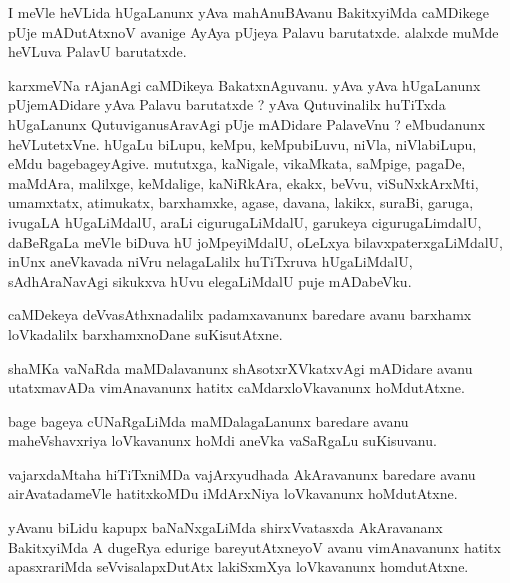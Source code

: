 \documentclass{article}
\begin{document}
\begin{mng}%
I meVle heVLida hUgaLanunx yAva mahAnuBAvanu BakitxyiMda caMDikege pUje mADutAtxnoV avanige AyAya 
pUjeya Palavu barutatxde. alalxde muMde heVLuva PalavU barutatxde.
\end{mng}

\begin{mng}%
karxmeVNa rAjanAgi caMDikeya BakatxnAguvanu. yAva yAva hUgaLanunx pUjemADidare yAva Palavu 
barutatxde ? yAva Qutuvinalilx huTiTxda hUgaLanunx QutuviganusAravAgi pUje mADidare PalaveVnu ? 
eMbudanunx heVLutetxVne. hUgaLu biLupu, keMpu, keMpubiLuvu, niVla, niVlabiLupu, eMdu 
bagebageyAgive. mututxga, kaNigale, vikaMkata, saMpige, pagaDe, maMdAra, malilxge, keMdalige, 
kaNiRkAra, ekakx, beVvu, viSuNxkArxMti, umamxtatx, atimukatx, barxhamxke, agase, davana, lakikx, 
suraBi, garuga, ivugaLA hUgaLiMdalU, araLi cigurugaLiMdalU, garukeya cigurugaLimdalU, daBeRgaLa 
meVle biDuva hU joMpeyiMdalU, oLeLxya bilavxpaterxgaLiMdalU, inUnx aneVkavada niVru nelagaLalilx 
huTiTxruva hUgaLiMdalU, sAdhAraNavAgi sikukxva hUvu elegaLiMdalU puje mADabeVku.
\end{mng}

\begin{mng}%
caMDekeya deVvasAthxnadalilx padamxavanunx baredare avanu barxhamx loVkadalilx barxhamxnoDane 
suKisutAtxne.
\end{mng}

\begin{mng}%
shaMKa vaNaRda maMDalavanunx shAsotxrXVkatxvAgi mADidare avanu utatxmavADa vimAnavanunx hatitx 
caMdarxloVkavanunx hoMdutAtxne.
\end{mng}

\begin{mng}%
bage bageya cUNaRgaLiMda maMDalagaLanunx baredare avanu maheVshavxriya loVkavanunx hoMdi aneVka 
vaSaRgaLu suKisuvanu.
\end{mng}

\begin{mng}%
vajarxdaMtaha hiTiTxniMDa vajArxyudhada AkAravanunx baredare avanu airAvatadameVle hatitxkoMDu 
iMdArxNiya loVkavanunx hoMdutAtxne.
\end{mng}

\begin{mng}%
yAvanu biLidu kapupx baNaNxgaLiMda shirxVvatasxda AkAravananx BakitxyiMda A dugeRya edurige 
bareyutAtxneyoV avanu vimAnavanunx hatitx apasxrariMda seVvisalapxDutAtx lakiSxmXya loVkavanunx 
homdutAtxne.
\end{mng}
\end{document}
